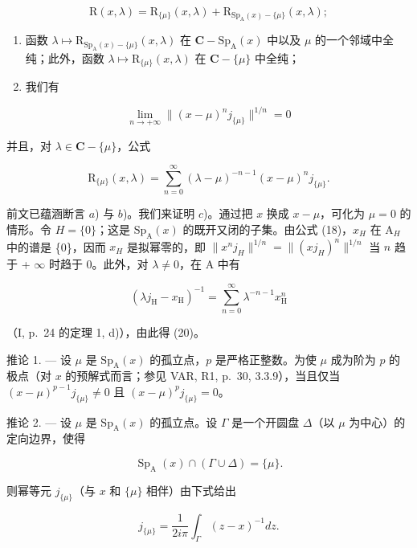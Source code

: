 \[
\mathrm{R} (x, \lambda) = \mathrm{R} _ {\{\mu \}} (x, \lambda) + \mathrm{R} _ {\mathrm{Sp} _ {\mathrm{A}} (x) - \{\mu \}} (x, \lambda);
\]

\begin{enumerate}
\def\labelenumi{\alph{enumi})}
\setcounter{enumi}{1}
\item
  函数 \(\lambda \mapsto \mathrm{R}_{\mathrm{Sp}_{\mathrm{A}}(x)-\{\mu\}}(x,\lambda)\) 在 \(\mathbf{C}-\mathrm{Sp}_{\mathrm{A}}(x)\) 中以及 \(\mu\) 的一个邻域中全纯；此外，函数 \(\lambda \mapsto \mathrm{R}_{\{\mu\}}(x,\lambda)\) 在 \(\mathbf{C}-\{\mu\}\) 中全纯；
\item
  我们有
\end{enumerate}

\[
\lim _ {n \to + \infty} \| (x - \mu) ^ {n} j _ {\{\mu \}} \| ^ {1 / n} = 0
\]

并且，对 \(\lambda \in \mathbf{C} - \{\mu\}\)，公式

\[
\mathrm{R} _ {\{\mu \}} (x, \lambda) = \sum_ {n = 0} ^ {\infty} (\lambda - \mu) ^ {- n - 1} (x - \mu) ^ {n} j _ {\{\mu \}}.\tag{20}
\]

前文已蕴涵断言 \(a\)) 与 \(b\))。我们来证明 \(c\))。通过把 \(x\) 换成 \(x-\mu\)，可化为 \(\mu=0\) 的情形。令 \(H = \{0\}\)；这是 \(\mathrm{Sp}_{\mathrm{A}}(x)\) 的既开又闭的子集。由公式 (18)，\(x_{H}\) 在 \(\mathrm{A}_{H}\) 中的谱是 \{0\}，因而 \(x_{H}\) 是拟幂零的，即 \(\|x^{n}j_{H}\|^{1/n}=\|(xj_{H})^{n}\|^{1/n}\) 当 \(n\) 趋于 + \(\infty\) 时趋于 0。此外，对 \(\lambda\neq0\)，在 A 中有

\[
\left(\lambda j _ {\mathrm{H}} - x _ {\mathrm{H}}\right) ^ {- 1} = \sum_ {n = 0} ^ {\infty} \lambda^ {- n - 1} x _ {\mathrm{H}} ^ {n}
\]

（I, p.~24 的定理 1, d)），由此得 (20)。

推论 1. --- 设 \(\mu\) 是 \(\mathrm{Sp}_{\mathrm{A}}(x)\) 的孤立点，\(p\) 是严格正整数。为使 \(\mu\) 成为阶为 \(p\) 的极点（对 \(x\) 的预解式而言；参见 VAR, R1, p.~30, 3.3.9），当且仅当 \((x - \mu)^{p-1} j_{\{\mu\}} \neq 0\) 且 \((x - \mu)^{p} j_{\{\mu\}} = 0\)。

推论 2. --- 设 \(\mu\) 是 \(\mathrm{Sp}_{\mathrm{A}}(x)\) 的孤立点。设 \(\Gamma\) 是一个开圆盘 \(\Delta\)（以 \(\mu\) 为中心）的定向边界，使得

\[
\operatorname{Sp} _ {\mathrm{A}} (x) \cap (\Gamma \cup \Delta) = \{\mu \}.
\]

则幂等元 \(j_{\{\mu \}}\)（与 \(x\) 和 \(\{\mu\}\) 相伴）由下式给出

\[
j _ {\{\mu \}} = \frac {1}{2 i \pi} \int_ {\Gamma} (z - x) ^ {- 1} d z.
\]

